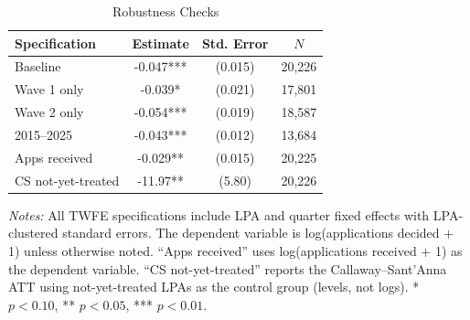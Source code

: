 \begin{table}[H]
\centering
\caption{Robustness Checks}
\begin{threeparttable}
\begin{tabular}{lccc}
\toprule
Specification & Estimate & Std. Error & $N$ \\
\midrule
Baseline & -0.047*** & (0.015) & 20,226 \\
Wave 1 only & -0.039* & (0.021) & 17,801 \\
Wave 2 only & -0.054*** & (0.019) & 18,587 \\
2015--2025 & -0.043*** & (0.012) & 13,684 \\
Apps received & -0.029** & (0.015) & 20,225 \\
CS not-yet-treated & -11.97** & (5.80) & 20,226 \\
\bottomrule
\end{tabular}
\begin{tablenotes}[flushleft]
\small
\item \textit{Notes:} All TWFE specifications include LPA and quarter fixed effects with LPA-clustered standard errors. The dependent variable is log(applications decided + 1) unless otherwise noted. ``Apps received'' uses log(applications received + 1) as the dependent variable. ``CS not-yet-treated'' reports the Callaway--Sant'Anna ATT using not-yet-treated LPAs as the control group (levels, not logs). * $p<0.10$, ** $p<0.05$, *** $p<0.01$.
\end{tablenotes}
\end{threeparttable}
\label{tab:robustness}
\end{table}
